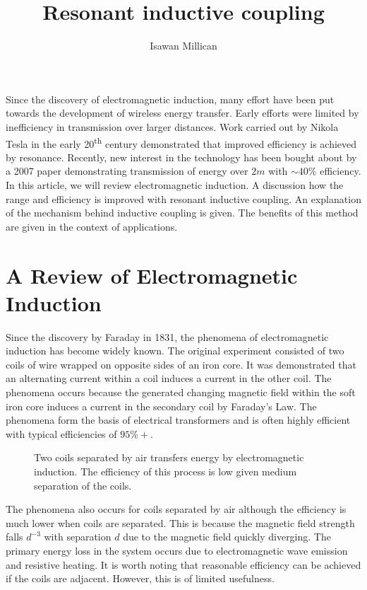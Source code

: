 \documentclass[a4paper,justified,nobib]{tufte-handout}
\begin{document}
\title{Resonant inductive coupling}
\author{Isawan Millican}
\maketitle

Since the discovery of electromagnetic induction,
many effort have been put towards the development of wireless energy transfer.
Early efforts were limited by inefficiency in transmission over larger distances.
Work carried out by Nikola Tesla in the early 20\textsuperscript{th} century
demonstrated that improved efficiency is achieved by resonance.\cite{tesla}
Recently, new interest in the technology has been bought about by a 2007
paper demonstrating transmission of energy over $2m$ with $\sim40\%$ efficiency.
In this article, we will review electromagnetic induction.
A discussion how the range and efficiency is improved with
resonant inductive coupling.
An explanation of the mechanism behind inductive coupling is given.
The benefits of this method are given in the context of applications.



\section{A Review of Electromagnetic Induction}

Since the discovery by Faraday in 1831\cite{faradaypublishedfirst},
the phenomena of electromagnetic induction has become widely known.
The original experiment consisted of two coils of wire wrapped on opposite
sides of an iron core.
It was demonstrated that an alternating current within a coil induces
a current in the other coil.
The phenomena occurs because the generated changing magnetic
field within the soft iron core induces a current in the secondary coil by
Faraday's Law.
The phenomena form the basis of electrical transformers and
is often highly efficient with typical efficiencies of $95\%+$.

\begin{figure}
  \center
  
  \caption{Two coils separated by air transfers energy by
  electromagnetic induction.
  The efficiency of this process is low given medium separation of the coils.}
\end{figure}

The phenomena also occurs for coils separated by air
although the efficiency is much lower when coils are separated.
This is because the magnetic field strength falls $d^{-3}$ with separation $d$
due to the magnetic field quickly diverging.
The primary energy loss in the system occurs due to electromagnetic wave emission
and resistive heating.
It is worth noting that reasonable efficiency can be achieved if the coils
are adjacent.
However, this is of limited usefulness.
\end{document}
